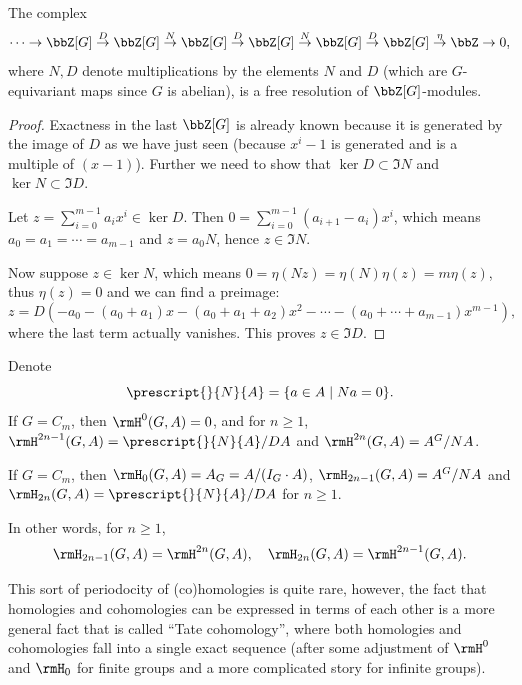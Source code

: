 \begin{thm}
    The complex
    \[\cdots\to \bbZ[G]\overset{D}{\to} \bbZ[G]\overset{N}{\to}\bbZ[G]\overset{D}{\to}\bbZ[G]\overset{N}{\to}\bbZ[G]\overset{D}{\to}\bbZ[G]\overset{\eta}{\to}\bbZ\to 0,\]
    where $N,D$ denote multiplications by the elements $N$ and $D$ (which are $G$-equivariant maps since $G$ is abelian), is a free resolution of $\bbZ[G]$-modules.
\end{thm}
\begin{proof}
    Exactness in the last $\bbZ[G]$ is already known because it is generated by the image of $D$ as we have just seen (because $x^i-1$ is generated and is a multiple of $(x-1)$). Further we need to show that $\ker D\subset \Im N$ and $\ker N\subset \Im D$. 

    Let $z=\sum_{i=0}^{m-1}a_ix^i\in\ker D$. Then $0=\sum_{i=0}^{m-1}(a_{i+1}-a_i)x^i$, which means $a_0=a_1=\cdots=a_{m-1}$ and $z=a_0 N$, hence $z\in \Im N$.

    Now suppose $z\in \ker N$, which means $0=\eta(Nz)=\eta(N)\eta(z)=m\eta(z)$, thus $\eta(z)=0$ and we can find a preimage:
    \[z=D(-a_0-(a_0+a_1)x-(a_0+a_1+a_2)x^2-\cdots -(a_0+\cdots +a_{m-1})x^{m-1}),\]
    where the last term actually vanishes. This proves $z\in \Im D$.
\end{proof}
\begin{cor}
    Denote
    \[\prescript{}{N}{A}=\{a\in A\mid Na=0\}.\]
    If $G=C_m$, then $\rmH^0(G,A)=0$, and for $n\geq 1$, $\rmH^{2n-1}(G,A)=\prescript{}{N}{A}\slash DA$ and $\rmH^{2n}(G,A)=A^G\slash NA$.
\end{cor}
\begin{cor}
    If $G=C_m$, then $\rmH_0(G,A)=A_G=A\slash (I_G\cdot A)$, $\rmH_{2n-1}(G,A)=A^G\slash NA$ and $\rmH_{2n}(G,A)=\prescript{}{N}{A}\slash DA$ for $n\geq 1$.

    In other words, for $n\geq 1$,
    \[\rmH_{2n-1}(G,A)=\rmH^{2n}(G,A),\quad \rmH_{2n}(G,A)=\rmH^{2n-1}(G,A).\]
\end{cor}
\begin{rem}
    This sort of periodocity of (co)homologies is quite rare, however, the fact that homologies and cohomologies can be expressed in terms of each other is a more general fact that is called ``Tate cohomology'', where both homologies and cohomologies fall into a single exact sequence (after some adjustment of $\rmH^0$ and $\rmH_0$ for finite groups and a more complicated story for infinite groups). 
\end{rem}




